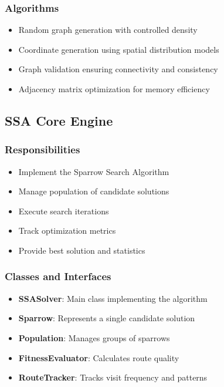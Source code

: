 \documentclass[conference]{IEEEtran}
\begin{document}
\subsubsection{Algorithms}
\begin{itemize}
    \item Random graph generation with controlled density
    \item Coordinate generation using spatial distribution models
    \item Graph validation ensuring connectivity and consistency
    \item Adjacency matrix optimization for memory efficiency
\end{itemize}

\subsection{SSA Core Engine}

\subsubsection{Responsibilities}
\begin{itemize}
    \item Implement the Sparrow Search Algorithm
    \item Manage population of candidate solutions
    \item Execute search iterations
    \item Track optimization metrics
    \item Provide best solution and statistics
\end{itemize}

\subsubsection{Classes and Interfaces}
\begin{itemize}
    \item \textbf{SSASolver}: Main class implementing the algorithm
    \item \textbf{Sparrow}: Represents a single candidate solution
    \item \textbf{Population}: Manages groups of sparrows
    \item \textbf{FitnessEvaluator}: Calculates route quality
    \item \textbf{RouteTracker}: Tracks visit frequency and patterns
\end{itemize}
\end{document}
